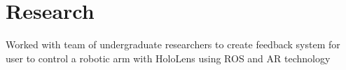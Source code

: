 \documentclass[]{deedy-resume-openfont}
\begin{document}
\begin{minipage}[t]{0.66\textwidth}

\section{Research}
\begin{tightemize}
\item Worked with team of undergraduate researchers to create feedback system for user to control a robotic arm with HoloLens using ROS and AR technology
\end{tightemize}

\sectionsep






\end{minipage} 
\end{document}

